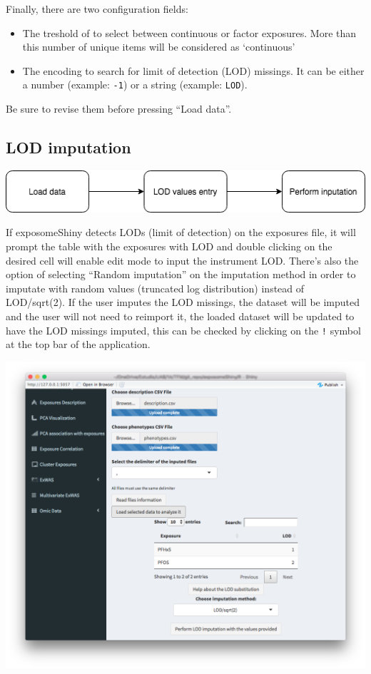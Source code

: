 \documentclass[
]{book}
\providecommand{\tightlist}{%
  \setlength{\itemsep}{0pt}\setlength{\parskip}{0pt}}
\begin{document}
Finally, there are two configuration fields:

\begin{itemize}
\tightlist
\item
  The treshold of to select between continuous or factor exposures. More than this number of unique items will be considered as `continuous'
\item
  The encoding to search for limit of detection (LOD) missings. It can be either a number (example: \texttt{-1}) or a string (example: \texttt{LOD}).
\end{itemize}

Be sure to revise them before pressing ``Load data''.

\hypertarget{lod-imputation}{%
\subsection{LOD imputation}\label{lod-imputation}}

\includegraphics{images/analysis1_1.png}

If exposomeShiny detects LODs (limit of detection) on the exposures file, it will prompt the table with the exposures with LOD and double clicking on the desired cell will enable edit mode to input the instrument LOD. There's also the option of selecting ``Random imputation'' on the imputation method in order to imputate with random values (truncated log distribution) instead of LOD/sqrt(2). If the user imputes the LOD missings, the dataset will be imputed and the user will not need to reimport it, the loaded dataset will be updated to have the LOD missings imputed, this can be checked by clicking on the \texttt{!} symbol at the top bar of the application.

\includegraphics{images/analysis1_3.png}
\end{document}
